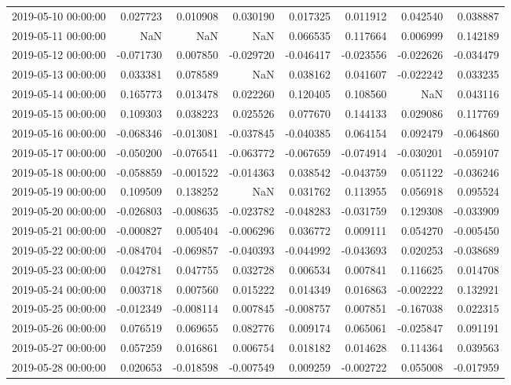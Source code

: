 \begin{tabular}{lrrrrrrr}
2019-05-10 00:00:00 & 0.027723 & 0.010908 & 0.030190 & 0.017325 & 0.011912 & 0.042540 & 0.038887 \\
2019-05-11 00:00:00 & NaN & NaN & NaN & 0.066535 & 0.117664 & 0.006999 & 0.142189 \\
2019-05-12 00:00:00 & -0.071730 & 0.007850 & -0.029720 & -0.046417 & -0.023556 & -0.022626 & -0.034479 \\
2019-05-13 00:00:00 & 0.033381 & 0.078589 & NaN & 0.038162 & 0.041607 & -0.022242 & 0.033235 \\
2019-05-14 00:00:00 & 0.165773 & 0.013478 & 0.022260 & 0.120405 & 0.108560 & NaN & 0.043116 \\
2019-05-15 00:00:00 & 0.109303 & 0.038223 & 0.025526 & 0.077670 & 0.144133 & 0.029086 & 0.117769 \\
2019-05-16 00:00:00 & -0.068346 & -0.013081 & -0.037845 & -0.040385 & 0.064154 & 0.092479 & -0.064860 \\
2019-05-17 00:00:00 & -0.050200 & -0.076541 & -0.063772 & -0.067659 & -0.074914 & -0.030201 & -0.059107 \\
2019-05-18 00:00:00 & -0.058859 & -0.001522 & -0.014363 & 0.038542 & -0.043759 & 0.051122 & -0.036246 \\
2019-05-19 00:00:00 & 0.109509 & 0.138252 & NaN & 0.031762 & 0.113955 & 0.056918 & 0.095524 \\
2019-05-20 00:00:00 & -0.026803 & -0.008635 & -0.023782 & -0.048283 & -0.031759 & 0.129308 & -0.033909 \\
2019-05-21 00:00:00 & -0.000827 & 0.005404 & -0.006296 & 0.036772 & 0.009111 & 0.054270 & -0.005450 \\
2019-05-22 00:00:00 & -0.084704 & -0.069857 & -0.040393 & -0.044992 & -0.043693 & 0.020253 & -0.038689 \\
2019-05-23 00:00:00 & 0.042781 & 0.047755 & 0.032728 & 0.006534 & 0.007841 & 0.116625 & 0.014708 \\
2019-05-24 00:00:00 & 0.003718 & 0.007560 & 0.015222 & 0.014349 & 0.016863 & -0.002222 & 0.132921 \\
2019-05-25 00:00:00 & -0.012349 & -0.008114 & 0.007845 & -0.008757 & 0.007851 & -0.167038 & 0.022315 \\
2019-05-26 00:00:00 & 0.076519 & 0.069655 & 0.082776 & 0.009174 & 0.065061 & -0.025847 & 0.091191 \\
2019-05-27 00:00:00 & 0.057259 & 0.016861 & 0.006754 & 0.018182 & 0.014628 & 0.114364 & 0.039563 \\
2019-05-28 00:00:00 & 0.020653 & -0.018598 & -0.007549 & 0.009259 & -0.002722 & 0.055008 & -0.017959 \\

\end{tabular}
